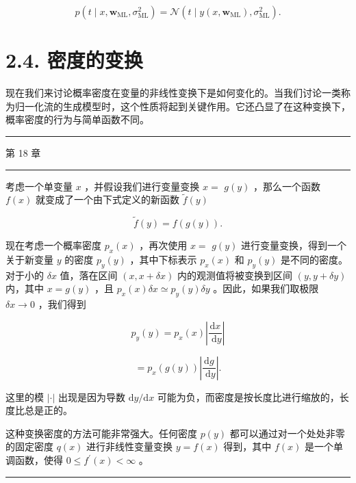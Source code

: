 \documentclass[10pt]{article}
\newcommand{\HRule}{\begin{center}\rule{0.9\linewidth}{0.2mm}\end{center}}
\begin{document}
\[
p\left( {t \mid  x,{\mathbf{w}}_{\mathrm{{ML}}},{\sigma }_{\mathrm{{ML}}}^{2}}\right)  = \mathcal{N}\left( {t \mid  y\left( {x,{\mathbf{w}}_{\mathrm{{ML}}}}\right) ,{\sigma }_{\mathrm{{ML}}}^{2}}\right) . \tag{2.69}
\]

\section*{2.4. 密度的变换}

现在我们来讨论概率密度在变量的非线性变换下是如何变化的。当我们讨论一类称为归一化流的生成模型时，这个性质将起到关键作用。它还凸显了在这种变换下，概率密度的行为与简单函数不同。

\HRule

第 18 章

\HRule

考虑一个单变量 \(x\) ，并假设我们进行变量变换 \(x =\)  \(g\left( y\right)\) ，那么一个函数 \(f\left( x\right)\) 就变成了一个由下式定义的新函数 \(\widetilde{f}\left( y\right)\)

\[
\widetilde{f}\left( y\right)  = f\left( {g\left( y\right) }\right) . \tag{2.70}
\]

现在考虑一个概率密度 \({p}_{x}\left( x\right)\) ，再次使用 \(x =\)  \(g\left( y\right)\) 进行变量变换，得到一个关于新变量 \(y\) 的密度 \({p}_{y}\left( y\right)\) ，其中下标表示 \({p}_{x}\left( x\right)\) 和 \({p}_{y}\left( y\right)\) 是不同的密度。对于小的 \({\delta x}\) 值，落在区间 \(\left( {x,x + {\delta x}}\right)\) 内的观测值将被变换到区间 \(\left( {y,y + {\delta y}}\right)\) 内，其中 \(x = g\left( y\right)\) ，且 \({p}_{x}\left( x\right) {\delta x} \simeq  {p}_{y}\left( y\right) {\delta y}\) 。因此，如果我们取极限 \({\delta x} \rightarrow  0\) ，我们得到

\[
{p}_{y}\left( y\right)  = {p}_{x}\left( x\right) \left| \frac{\mathrm{d}x}{\mathrm{\;d}y}\right|
\]

\[
= {p}_{x}\left( {g\left( y\right) }\right) \left| \frac{\mathrm{d}g}{\mathrm{\;d}y}\right| . \tag{2.71}
\]

这里的模 \(\left| \cdot \right|\) 出现是因为导数 \(\mathrm{d}y/\mathrm{d}x\) 可能为负，而密度是按长度比进行缩放的，长度比总是正的。

这种变换密度的方法可能非常强大。任何密度 \(p\left( y\right)\) 都可以通过对一个处处非零的固定密度 \(q\left( x\right)\) 进行非线性变量变换 \(y = f\left( x\right)\) 得到，其中 \(f\left( x\right)\) 是一个单调函数，使得 \(0 \leq  {f}^{\prime }\left( x\right)  < \infty\) 。

\HRule
\end{document}
